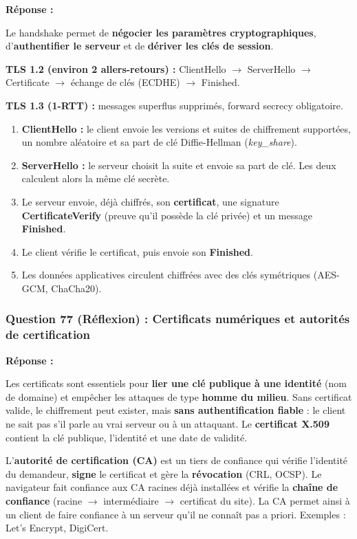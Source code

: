 \documentclass[12pt,a4paper]{article}
\newcommand{\reponse}{\textbf{Réponse :}\par}
\newcommand{\fl}{\ensuremath{\rightarrow}}
\begin{document}
\reponse
Le handshake permet de \textbf{négocier les paramètres
cryptographiques}, d'\textbf{authentifier le serveur} et de
\textbf{dériver les clés de session}.

\textbf{TLS 1.2 (environ 2 allers-retours) :} ClientHello \fl{}
ServerHello \fl{} Certificate \fl{} échange de clés (ECDHE) \fl{}
Finished.

\textbf{TLS 1.3 (1-RTT) :} messages superflus supprimés, forward secrecy
obligatoire.
\begin{enumerate}
    \item \textbf{ClientHello :} le client envoie les versions et suites
    de chiffrement supportées, un nombre aléatoire et sa part de clé
    Diffie-Hellman (\textit{key\_share}).
    \item \textbf{ServerHello :} le serveur choisit la suite et envoie
    sa part de clé. Les deux calculent alors la même clé secrète.
    \item Le serveur envoie, déjà chiffrés, son \textbf{certificat}, une
    signature \textbf{CertificateVerify} (preuve qu'il possède la clé
    privée) et un message \textbf{Finished}.
    \item Le client vérifie le certificat, puis envoie son
    \textbf{Finished}.
    \item Les données applicatives circulent chiffrées avec des clés
    symétriques (AES-GCM, ChaCha20).
\end{enumerate}

\subsubsection*{Question 77 (Réflexion) : Certificats numériques et autorités de certification}

\reponse
Les certificats sont essentiels pour \textbf{lier une clé publique à une
identité} (nom de domaine) et empêcher les attaques de type
\textbf{homme du milieu}. Sans certificat valide, le chiffrement peut
exister, mais \textbf{sans authentification fiable} : le client ne sait
pas s'il parle au vrai serveur ou à un attaquant. Le \textbf{certificat
X.509} contient la clé publique, l'identité et une date de validité.

L'\textbf{autorité de certification (CA)} est un tiers de confiance qui
vérifie l'identité du demandeur, \textbf{signe} le certificat et gère
la \textbf{révocation} (CRL, OCSP). Le navigateur fait confiance aux CA
racines déjà installées et vérifie la \textbf{chaîne de confiance}
(racine \fl{} intermédiaire \fl{} certificat du site). La CA permet ainsi
à un client de faire confiance à un serveur qu'il ne connaît pas a
priori. Exemples : Let's Encrypt, DigiCert.
\end{document}
